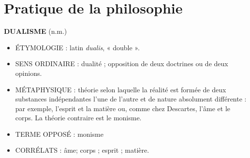 
\section{Pratique de la philosophie}
{\bf D{\footnotesize UALISME}} (n.m.)

\begin{itemize}[leftmargin=1cm, label=, itemsep=1pt]
\item {\footnotesize ÉTYMOLOGIE} :  latin {\it dualis}, « double ».
\item {\footnotesize SENS ORDINAIRE} : dualité ; opposition de deux doctrines ou de deux opinions.
\item {\footnotesize MÉTAPHYSIQUE} : théorie selon laquelle la réalité
est formée de deux substances indépendantes l’une de l’autre et de
nature absolument différente : par exemple, l'esprit et la matière ou,
comme chez Descartes, l'âme et le corps. La théorie contraire est le
monisme.
\end{itemize}

\begin{itemize}[leftmargin=1cm, label=, itemsep=1pt]
\item {\footnotesize TERME OPPOSÉ} : monisme
\item {\footnotesize CORRÉLATS} : âme; corps ; esprit ; matière.
\end{itemize}

